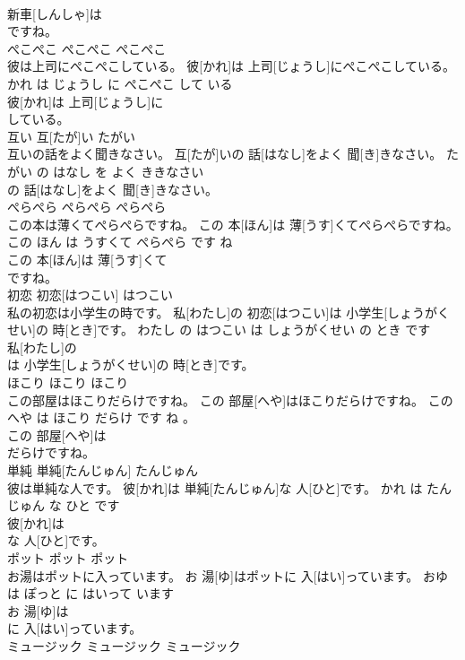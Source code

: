 \documentclass[8pt]{extreport}
\begin{document}
\begin{CJK}{UTF8}{min}
\\	新車[しんしゃ]は
\\	ですね。			
\\	ぺこぺこ	ぺこぺこ	ぺこぺこ	
\\	彼は上司にぺこぺこしている。	彼[かれ]は 上司[じょうし]にぺこぺこしている。	かれ は じょうし に ぺこぺこ して いる	
\\	彼[かれ]は 上司[じょうし]に
\\	している。			
\\	互い	互[たが]い	たがい	
\\	互いの話をよく聞きなさい。	互[たが]いの 話[はなし]をよく 聞[き]きなさい。	たがい の はなし を よく ききなさい	
\\	の 話[はなし]をよく 聞[き]きなさい。			
\\	ぺらぺら	ぺらぺら	ぺらぺら	
\\	この本は薄くてぺらぺらですね。	この 本[ほん]は 薄[うす]くてぺらぺらですね。	この ほん は うすくて ぺらぺら です ね	
\\	この 本[ほん]は 薄[うす]くて
\\	ですね。			
\\	初恋	初恋[はつこい]	はつこい	
\\	私の初恋は小学生の時です。	私[わたし]の 初恋[はつこい]は 小学生[しょうがくせい]の 時[とき]です。	わたし の はつこい は しょうがくせい の とき です	
\\	私[わたし]の
\\	は 小学生[しょうがくせい]の 時[とき]です。			
\\	ほこり	ほこり	ほこり	
\\	この部屋はほこりだらけですね。	この 部屋[へや]はほこりだらけですね。	この へや は ほこり だらけ です ね 。	
\\	この 部屋[へや]は
\\	だらけですね。			
\\	単純	単純[たんじゅん]	たんじゅん	
\\	彼は単純な人です。	彼[かれ]は 単純[たんじゅん]な 人[ひと]です。	かれ は たんじゅん な ひと です	
\\	彼[かれ]は
\\	な 人[ひと]です。			
\\	ポット	ポット	ポット	
\\	お湯はポットに入っています。	お 湯[ゆ]はポットに 入[はい]っています。	おゆ は ぽっと に はいって います	
\\	お 湯[ゆ]は
\\	に 入[はい]っています。			
\\	ミュージック	ミュージック	ミュージック	

\end{CJK}
\end{document}
